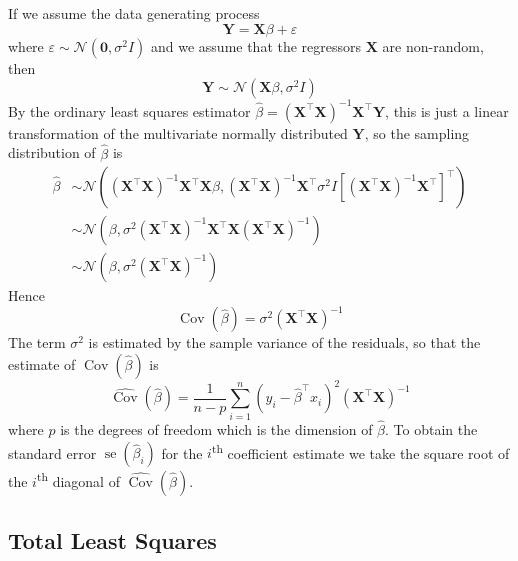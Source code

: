\documentclass[11pt]{report} %
\begin{document}
If we assume the data generating process
\begin{equation}
\mathbf{Y} = \mathbf{X}\beta + \varepsilon
\end{equation}
where $\varepsilon \sim \mathcal{N}\left(\mathbf{0}, \sigma^{2}I\right)$ and we assume that the regressors $\mathbf{X}$ are non-random, then
\begin{equation}
\mathbf{Y} \sim \mathcal{N}\left(\mathbf{X}\beta, \sigma^{2}I\right)
\end{equation}
By the ordinary least squares estimator $\hat{\beta} = \left(\mathbf{X}^{\top}\mathbf{X}\right)^{-1}\mathbf{X}^{\top}\mathbf{Y}$, this is just a linear transformation of the multivariate normally distributed $\mathbf{Y}$, so the sampling distribution of $\hat{\beta}$ is
\begin{align}
\hat{\beta} &\sim \mathcal{N}\left(\left(\mathbf{X}^{\top}\mathbf{X}\right)^{-1}\mathbf{X}^{\top}\mathbf{X}\beta, \left(\mathbf{X}^{\top}\mathbf{X}\right)^{-1}\mathbf{X}^{\top}\sigma^{2}I\left[\left(\mathbf{X}^{\top}\mathbf{X}\right)^{-1}\mathbf{X}^{\top}\right]^{\top}\right) \\
&\sim \mathcal{N}\left(\beta, \sigma^{2}\left(\mathbf{X}^{\top}\mathbf{X}\right)^{-1}\mathbf{X}^{\top}\mathbf{X}\left(\mathbf{X}^{\top}\mathbf{X}\right)^{-1}\right) \\
&\sim \mathcal{N}\left(\beta, \sigma^{2}\left(\mathbf{X}^{\top}\mathbf{X}\right)^{-1}\right)
\end{align}
Hence
\begin{equation}
\operatorname{Cov}\left(\hat{\beta}\right) = \sigma^{2}\left(\mathbf{X}^{\top}\mathbf{X}\right)^{-1}
\end{equation}
The term $\sigma^{2}$ is estimated by the sample variance of the residuals, so that the estimate of $\operatorname{Cov}\left(\hat{\beta}\right)$ is
\begin{equation}
\widehat{\operatorname{Cov}}\left(\hat{\beta}\right) = \dfrac{1}{n - p}\sum_{i = 1}^{n}\left(y_{i} - \hat{\beta}^{\top}x_{i}\right)^{2}\left(\mathbf{X}^{\top}\mathbf{X}\right)^{-1}
\end{equation}
where $p$ is the degrees of freedom which is the dimension of $\hat{\beta}$. To obtain the standard error $\operatorname{se}\left(\hat{\beta}_{i}\right)$ for the $i$\textsuperscript{th} coefficient estimate we take the square root of the $i$\textsuperscript{th} diagonal of $\widehat{\operatorname{Cov}}\left(\hat{\beta}\right)$.

\subsection{Total Least Squares}
\end{document}
